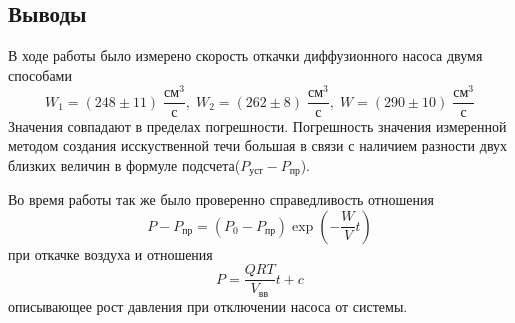\documentclass[a4paper, 12pt]{article}
\begin{document}
	
	\begin{center}
	    \section*{Выводы}
	\end{center}

	В ходе работы было измерено скорость откачки диффузионного насоса двумя способами
    \begin{equation}
        W_{1} = (248 \pm 11) \; \frac{\text{см}^3}{\text{с}}, \; W_{2} = (262 \pm 8)\; \frac{\text{см}^3}{\text{с}}, \; W = (290 \pm 10)\; \frac{\text{см}^3}{\text{с}}
    \end{equation}
    Значения совпадают в пределах погрешности. Погрешность значения измеренной методом создания исскуственной течи большая в связи с наличием разности двух близких величин в формуле подсчета($P_{уст} - P_{пр}$).

    Во время работы так же было проверенно справедливость отношения
    \begin{equation*}
        P-P_{пр}=(P_0 - P_{пр})\exp\left(-\frac{W}{V}t\right)
    \end{equation*}
    при откачке воздуха и отношения
    \begin{equation*}
        P = \frac{QRT}{V_{вв}}t + c
    \end{equation*}
    описывающее рост давления при отключении насоса от системы.

	\newpage
\end{document}
